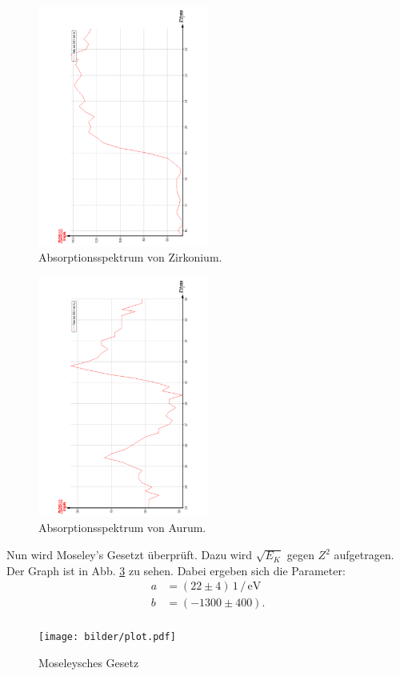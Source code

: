 \begin{figure}
  \centering
  \includegraphics[width=0.5\textwidth, angle=270]{bilder/AbsorpZr.pdf}
  \caption{Absorptionsspektrum von Zirkonium.}
  \label{fig:Zirkonium}
\end{figure}
\begin{figure}
  \centering
  \includegraphics[width=0.5\textwidth, angle=270]{bilder/AbsorpAu.pdf}
  \caption{Absorptionsspektrum von Aurum.}
  \label{fig:Aurum}
\end{figure}

\newpage
Nun wird Moseley's Gesetzt überprüft. Dazu wird $\sqrt{E_K}$ gegen $Z^2$ aufgetragen.
Der Graph ist in Abb. \ref{fig:Mose} zu sehen.
Dabei ergeben sich die Parameter:
\begin{align*}
  a &= (22 \pm 4) \,1\,/\, \si{\electronvolt}\\
  b &= (-1300 \pm 400). \\
\end{align*}
\begin{figure}
  \centering
  \texttt{[image: bilder/plot.pdf]}
  \caption{Moseleysches Gesetz}
  \label{fig:Mose}
\end{figure}
